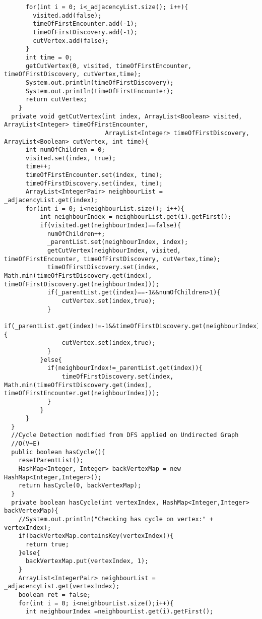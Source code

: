 \documentclass[11pt]{article}
\theoremstyle{definition}
\begin{document}
\begin{verbatim}
      for(int i = 0; i<_adjacencyList.size(); i++){
        visited.add(false);
        timeOfFirstEncounter.add(-1);
        timeOfFirstDiscovery.add(-1);
        cutVertex.add(false);
      }
      int time = 0;
      getCutVertex(0, visited, timeOfFirstEncounter, timeOfFirstDiscovery, cutVertex,time);
      System.out.println(timeOfFirstDiscovery);
      System.out.println(timeOfFirstEncounter);
      return cutVertex;
    }
  private void getCutVertex(int index, ArrayList<Boolean> visited, ArrayList<Integer> timeOfFirstEncounter, 
                            ArrayList<Integer> timeOfFirstDiscovery, ArrayList<Boolean> cutVertex, int time){
      int numOfChildren = 0;
      visited.set(index, true);
      time++;
      timeOfFirstEncounter.set(index, time);
      timeOfFirstDiscovery.set(index, time);
      ArrayList<IntegerPair> neighbourList =  _adjacencyList.get(index);
      for(int i = 0; i<neighbourList.size(); i++){
          int neighbourIndex = neighbourList.get(i).getFirst();
          if(visited.get(neighbourIndex)==false){
            numOfChildren++;
            _parentList.set(neighbourIndex, index);
            getCutVertex(neighbourIndex, visited, timeOfFirstEncounter, timeOfFirstDiscovery, cutVertex,time);
            timeOfFirstDiscovery.set(index, Math.min(timeOfFirstDiscovery.get(index), timeOfFirstDiscovery.get(neighbourIndex)));
            if(_parentList.get(index)==-1&&numOfChildren>1){
                cutVertex.set(index,true);
            }
            if(_parentList.get(index)!=-1&&timeOfFirstDiscovery.get(neighbourIndex)>=timeOfFirstEncounter.get(index)){
                cutVertex.set(index,true);
            }
          }else{
            if(neighbourIndex!=_parentList.get(index)){
                timeOfFirstDiscovery.set(index, Math.min(timeOfFirstDiscovery.get(index), timeOfFirstEncounter.get(neighbourIndex)));
            }
          }
      }
  }
  //Cycle Detection modified from DFS applied on Undirected Graph
  //O(V+E)
  public boolean hasCycle(){
    resetParentList();
    HashMap<Integer, Integer> backVertexMap = new HashMap<Integer,Integer>();
    return hasCycle(0, backVertexMap);
  }
  private boolean hasCycle(int vertexIndex, HashMap<Integer,Integer> backVertexMap){
    //System.out.println("Checking has cycle on vertex:" + vertexIndex);
    if(backVertexMap.containsKey(vertexIndex)){
      return true;
    }else{
      backVertexMap.put(vertexIndex, 1);
    }
    ArrayList<IntegerPair> neighbourList =  _adjacencyList.get(vertexIndex);
    boolean ret = false; 
    for(int i = 0; i<neighbourList.size();i++){
      int neighbourIndex =neighbourList.get(i).getFirst();

\end{verbatim}
\end{document}
